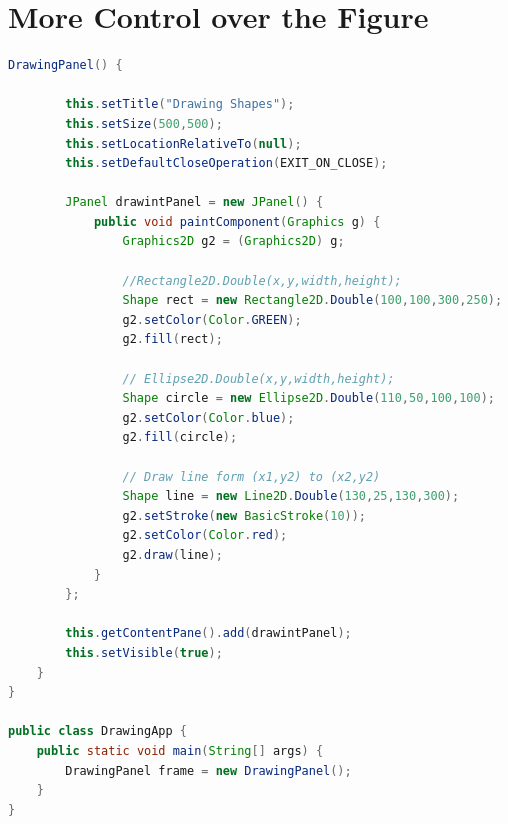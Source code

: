 \newpage
\section{More Control over the Figure }
\begin{frame}


\begin{lstlisting}[language=java]
DrawingPanel() {
		
		this.setTitle("Drawing Shapes");
		this.setSize(500,500);
		this.setLocationRelativeTo(null);
		this.setDefaultCloseOperation(EXIT_ON_CLOSE);
		
		JPanel drawintPanel = new JPanel() {
			public void paintComponent(Graphics g) {
				Graphics2D g2 = (Graphics2D) g;
				
				//Rectangle2D.Double(x,y,width,height);
				Shape rect = new Rectangle2D.Double(100,100,300,250);
				g2.setColor(Color.GREEN);
				g2.fill(rect);
				
				// Ellipse2D.Double(x,y,width,height);
				Shape circle = new Ellipse2D.Double(110,50,100,100);
				g2.setColor(Color.blue);
				g2.fill(circle);
				
				// Draw line form (x1,y2) to (x2,y2)
				Shape line = new Line2D.Double(130,25,130,300);
				g2.setStroke(new BasicStroke(10));
				g2.setColor(Color.red);
				g2.draw(line);	
			}
		};
		
		this.getContentPane().add(drawintPanel);
		this.setVisible(true);
	}
}

public class DrawingApp {
	public static void main(String[] args) {
		DrawingPanel frame = new DrawingPanel();
	}
}

\end{lstlisting}


\end{frame}
